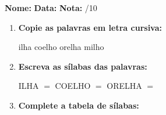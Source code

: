 \begin{exercicio}



\noindent\textbf{Nome:} \underline{\hspace{3.2cm}} \quad \textbf{Data:} \underline{\hspace{1.6cm}} \quad \textbf{Nota:} \underline{\hspace{0.9cm}}/10


\begin{enumerate}

  \item \textbf{Copie as palavras em letra cursiva:}
  \begin{center}
  ilha \quad coelho \quad orelha \quad milho
  \end{center}
  \begin{center}
  \underline{\hspace{2.4cm}} \quad \underline{\hspace{2.4cm}} \quad \underline{\hspace{2.4cm}} \quad \underline{\hspace{2.4cm}}
  \end{center}

  \item \textbf{Escreva as sílabas das palavras:}
  \begin{center}
  ILHA $=$ \underline{\hspace{1.5cm}} \underline{\hspace{1.5cm}} \quad COELHO $=$ \underline{\hspace{1.5cm}} \underline{\hspace{1.5cm}} \quad ORELHA $=$ \underline{\hspace{1.5cm}} \underline{\hspace{1.5cm}}
  \end{center}

  \item \textbf{Complete a tabela de sílabas:}

\begin{center}
\end{center}


\end{enumerate}
\end{exercicio}
